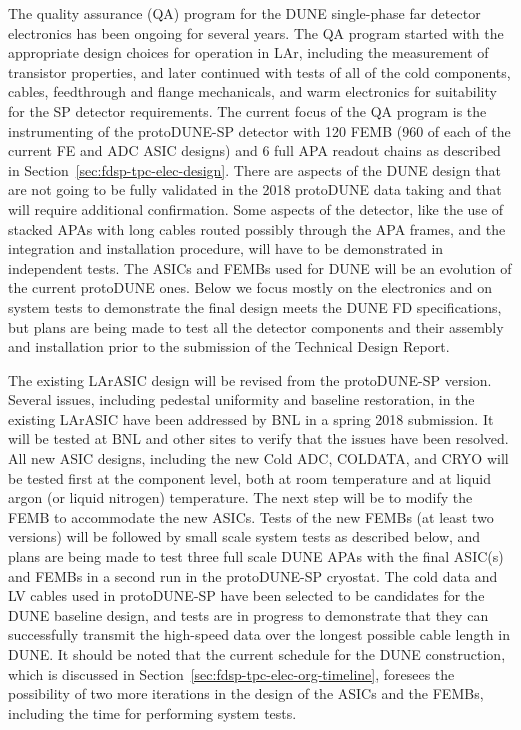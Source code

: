The quality assurance (QA) program for the DUNE single-phase far detector electronics has been ongoing for several years.  The QA program started with the appropriate design choices for operation
in LAr, including the measurement of transistor properties, and later
continued with tests of all of the cold components, cables, feedthrough and flange mechanicals, and warm electronics for suitability for the SP detector requirements.  The current focus of the QA program is the instrumenting of the protoDUNE-SP detector with 120 FEMB (960 of each of the current FE and ADC ASIC designs) and 6 full APA readout chains as described in Section~\ref{sec:fdsp-tpc-elec-design}. There are aspects of the DUNE design that are not going to be fully validated in the 2018 protoDUNE data taking and that will require additional confirmation. Some aspects of the detector, like the use of stacked APAs with long cables routed possibly through the APA frames, and the integration and installation procedure, will have to be demonstrated in independent tests. The ASICs and FEMBs used for DUNE will be an evolution of the current protoDUNE ones. Below we focus mostly on the electronics and on system tests to demonstrate the final design meets the DUNE FD specifications, but plans are being made to test all the detector components and their assembly and installation prior to the submission of the Technical Design Report.

The existing LArASIC design will be revised from the protoDUNE-SP version. Several issues, 
including pedestal uniformity and baseline restoration, in the existing LArASIC have been 
addressed by BNL in a spring 2018 submission. It will be tested at BNL and other sites to 
verify that the issues have been resolved. All new ASIC designs, including the new Cold ADC, COLDATA, and CRYO will be tested first at the component level, both at room temperature and at liquid argon (or liquid nitrogen) temperature. The next step will be to modify the FEMB to accommodate the new ASICs.  Tests of the new FEMBs (at least two versions) will be followed by small scale system tests as described below, and plans are being made to test three full scale DUNE APAs with the final ASIC(s) and FEMBs in a second run in the protoDUNE-SP cryostat.  The cold data and LV cables used in protoDUNE-SP have been selected to be candidates for the DUNE baseline design, and tests are in progress to demonstrate that they can successfully transmit the high-speed data over the longest possible cable length in DUNE. It should be noted that the current schedule for the DUNE construction, which is discussed in Section~\ref{sec:fdsp-tpc-elec-org-timeline}, foresees the possibility of two more iterations in the design of the ASICs and the FEMBs, including the time for performing system tests.

